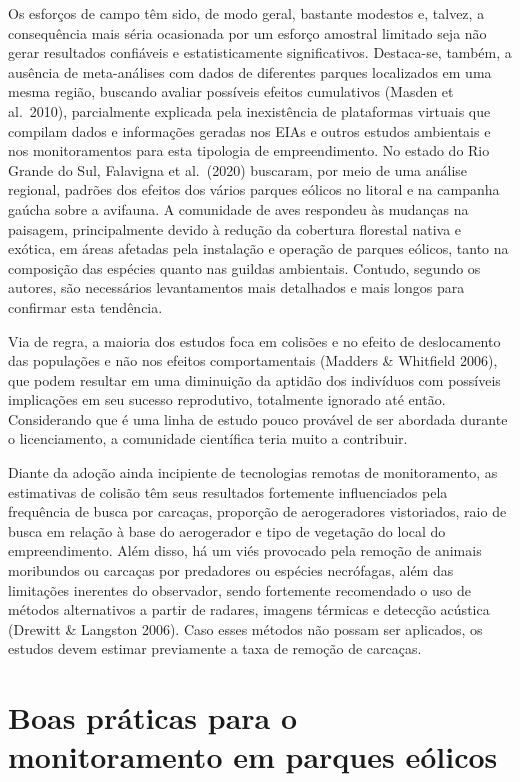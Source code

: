 \documentclass[
  oneside]{scrbook}
\begin{document}
Os esforços de campo têm sido, de modo geral, bastante modestos e, talvez, a consequência mais séria ocasionada por um esforço amostral limitado seja não gerar resultados confiáveis e estatisticamente significativos. Destaca-se, também, a ausência de meta-análises com dados de diferentes parques localizados em uma mesma região, buscando avaliar possíveis efeitos cumulativos (Masden et al.~2010), parcialmente explicada pela inexistência de plataformas virtuais que compilam dados e informações geradas nos EIAs e outros estudos ambientais e nos monitoramentos para esta tipologia de empreendimento. No estado do Rio Grande do Sul, Falavigna et al.~(2020) buscaram, por meio de uma análise regional, padrões dos efeitos dos vários parques eólicos no litoral e na campanha gaúcha sobre a avifauna. A comunidade de aves respondeu às mudanças na paisagem, principalmente devido à redução da cobertura florestal nativa e exótica, em áreas afetadas pela instalação e operação de parques eólicos, tanto na composição das espécies quanto nas guildas ambientais. Contudo, segundo os autores, são necessários levantamentos mais detalhados e mais longos para confirmar esta tendência.

Via de regra, a maioria dos estudos foca em colisões e no efeito de deslocamento das populações e não nos efeitos comportamentais (Madders \& Whitfield 2006), que podem resultar em uma diminuição da aptidão dos indivíduos com possíveis implicações em seu sucesso reprodutivo, totalmente ignorado até então. Considerando que é uma linha de estudo pouco provável de ser abordada durante o licenciamento, a comunidade científica teria muito a contribuir.

Diante da adoção ainda incipiente de tecnologias remotas de monitoramento, as estimativas de colisão têm seus resultados fortemente influenciados pela frequência de busca por carcaças, proporção de aerogeradores vistoriados, raio de busca em relação à base do aerogerador e tipo de vegetação do local do empreendimento. Além disso, há um viés provocado pela remoção de animais moribundos ou carcaças por predadores ou espécies necrófagas, além das limitações inerentes do observador, sendo fortemente recomendado o uso de métodos alternativos a partir de radares, imagens térmicas e detecção acústica (Drewitt \& Langston 2006). Caso esses métodos não possam ser aplicados, os estudos devem estimar previamente a taxa de remoção de carcaças.

\hypertarget{boas-pruxe1ticas-para-o-monitoramento-em-parques-euxf3licos}{%
\section{Boas práticas para o monitoramento em parques eólicos}\label{boas-pruxe1ticas-para-o-monitoramento-em-parques-euxf3licos}}
\end{document}
